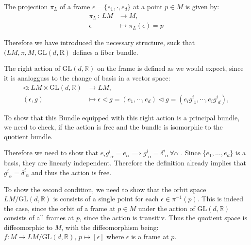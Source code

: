The projection $\pi_L$ of a frame $\epsilon = \{e_1, \cdot, e_d\}$ at a point \(p\in M\) is given by:
\begin{align*}
  \pi_L \, : \, LM &\longrightarrow M, \\
        \epsilon &\mapsto \pi_L(\epsilon)=p
\end{align*}

Therefore we have introduced the necessary structure, suck that $(LM, \pi, M, \text{GL}(d,\mathrm{R})$ defines a fiber bundle. 

The right action of \( \mathrm{GL}(d,\mathbb{R}) \) on the frame is defined as we would expect, since it is analogguss to the change of basis in a vector space:
\begin{align*}
  \triangleleft : LM \times \mathrm{GL}(d,\mathbb{R}) &\longrightarrow LM, \\
  (\epsilon, g) &\mapsto \epsilon \triangleleft g = (e_1, \cdots, e_d) \triangleleft g = (e_i g^i_{\,\,1}, \cdots, e_i g^i_{\,\,d}),
\end{align*}

To show that this Bundle equipped with this right action is a principal bundle, we need to check, if the action is free and the bundle is isomorphic to the quotient bundle.

Therefore we need to show that \( e_i g^i_{\,\,\alpha} = e_\alpha \implies g^i_{\,\,\alpha} = \delta^i_{\,\,\alpha} \, \forall \alpha \) . Since \( \{e_1, \dots, e_d\} \) is a basis, they are linearly independent. Therefore the definition already implies that \( g^i_{\,\,\alpha} = \delta^i_{\,\,\alpha} \) and thus the action is free.

To show the second condition, we need to show that the orbit space \( LM/\mathrm{GL}(d,\mathbb{R}) \) is consists of a single point for each \( \epsilon \in \pi^{-1}(p) \). This is indeed the case, since the orbit of a frame at \( p \in M \) under the action of \( \mathrm{GL}(d,\mathbb{R}) \) consists of all frames at \( p \), since the action is transitiv. Thus the quotient space is diffeomorphic to \( M \), with the diffeomorphism being: \( f: M \longrightarrow LM/\mathrm{GL}(d, \mathbb{R}), \, p \mapsto [\epsilon] \) where \( \epsilon \) is a frame at \( p \).


